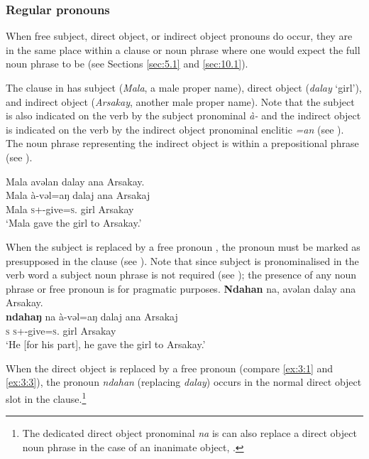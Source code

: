 \subsubsection{Regular pronouns}\label{sec:3.1.1.1}
\largerpage[2]
When free subject, direct object, or indirect object pronouns do occur, they are in the same place within a clause or noun phrase where one would expect the full noun phrase to be (see Sections \ref{sec:5.1} and \ref{sec:10.1}). 

The clause in  has subject (\textit{Mala}, a male proper name), direct object (\textit{dalay} ‘girl’), and indirect object (\textit{Arsakay}, another male proper name).  Note that the subject is also indicated on the verb by the subject pronominal \textit{à-} and the indirect object is indicated on the verb by the indirect object pronominal enclitic \textit{=an} (see ). The noun phrase representing the indirect object is within a prepositional phrase (see ). 

\ea \label{ex:3:1}
Mala  avəlan  dalay  ana  Arsakay.\\
\gll  Mala   à-vəl=aŋ     dalaj   ana   Arsakaj\\
      Mala   \textsc{s}+{\PFV}-give=\textsc{s}.{\IO}  girl  {\DAT} Arsakay\\
\glt ‘Mala gave the girl to Arsakay.’
\z

When the subject is replaced by a free pronoun , the pronoun must be marked as presupposed in the clause (see ). Note that since subject is pronominalised in the verb word a subject noun phrase is not required (see ); the presence of any noun phrase or free pronoun is for pragmatic purposes.
\ea \label{ex:3:2}
\textbf{Ndahan} na,    avəlan  dalay  ana  Arsakay.\\
\gll  \textbf{ndahaŋ}  na    à-vəl=aŋ     dalaj   ana   Arsakaj\\
      \textsc{s}    {\PSP}  \textsc{s}+{\PFV}-give=\textsc{s}.{\IO}  girl  {\DAT} Arsakay\\
\glt ‘He [for his part], he gave the girl to Arsakay.’
\z

When the direct object is replaced by a free pronoun (compare \ref{ex:3:1} and \ref{ex:3:3}), the pronoun \textit{ndahan} (replacing \textit{dalay}) occurs in the normal direct object slot in the clause.\footnote{The dedicated direct object pronominal \textit{na} is can also replace a direct object noun phrase in the case of an inanimate object, .}  

